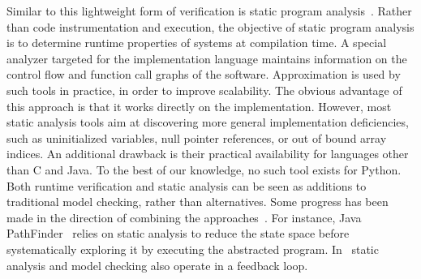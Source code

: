 \documentclass[sort&compress,preprint,3p]{elsarticle}
\begin{document}
Similar to this lightweight form of verification is static program
analysis~\cite{Schmidt98programanalysis}. Rather than code instrumentation and
execution, the objective of 
static program analysis is to determine runtime properties of systems at
compilation time.
A special analyzer targeted for the implementation language maintains
information on the control flow and function call graphs
of the software. Approximation is used by such tools in practice, in order to
improve scalability. The obvious advantage
of this approach is that it works directly on the implementation. However, most
static analysis tools aim at discovering 
more general implementation deficiencies, such as uninitialized variables, null
pointer references, or out of bound array indices. An additional drawback
is their 
practical availability for languages other than C and Java. To the best of our
knowledge, no such tool exists for Python.
Both runtime verification and static analysis can be seen as additions to
traditional model checking, rather than alternatives. Some progress has been 
made in the direction of combining the
approaches~\cite{Java_PathFinder,Linux_driver,Brat01combiningstatic}. For
instance, Java PathFinder~\cite{Java_PathFinder}
relies on static analysis to reduce the state space before systematically
exploring it by executing the abstracted program.
In~\cite{Brat01combiningstatic}
static analysis and model checking also operate in a feedback loop. 
\end{document}
